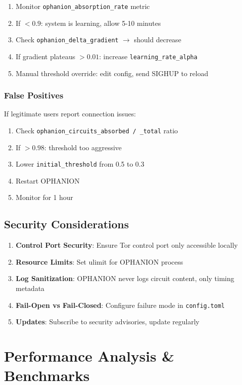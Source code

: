 \documentclass[11pt,a4paper]{article}
\begin{document}
\begin{enumerate}
\item Monitor \texttt{ophanion\_absorption\_rate} metric
\item If $< 0.9$: system is learning, allow 5-10 minutes
\item Check \texttt{ophanion\_delta\_gradient} $\to$ should decrease
\item If gradient plateaus $> 0.01$: increase \texttt{learning\_rate\_alpha}
\item Manual threshold override: edit config, send SIGHUP to reload
\end{enumerate}

\subsubsection{False Positives}

If legitimate users report connection issues:
\begin{enumerate}
\item Check \texttt{ophanion\_circuits\_absorbed / \_total} ratio
\item If $> 0.98$: threshold too aggressive
\item Lower \texttt{initial\_threshold} from 0.5 to 0.3
\item Restart OPHANION
\item Monitor for 1 hour
\end{enumerate}

\subsection{Security Considerations}

\begin{enumerate}
\item \textbf{Control Port Security}: Ensure Tor control port only accessible locally
\item \textbf{Resource Limits}: Set ulimit for OPHANION process
\item \textbf{Log Sanitization}: OPHANION never logs circuit content, only timing metadata
\item \textbf{Fail-Open vs Fail-Closed}: Configure failure mode in \texttt{config.toml}
\item \textbf{Updates}: Subscribe to security advisories, update regularly
\end{enumerate}

\newpage
\section{Performance Analysis \& Benchmarks}
\end{document}
